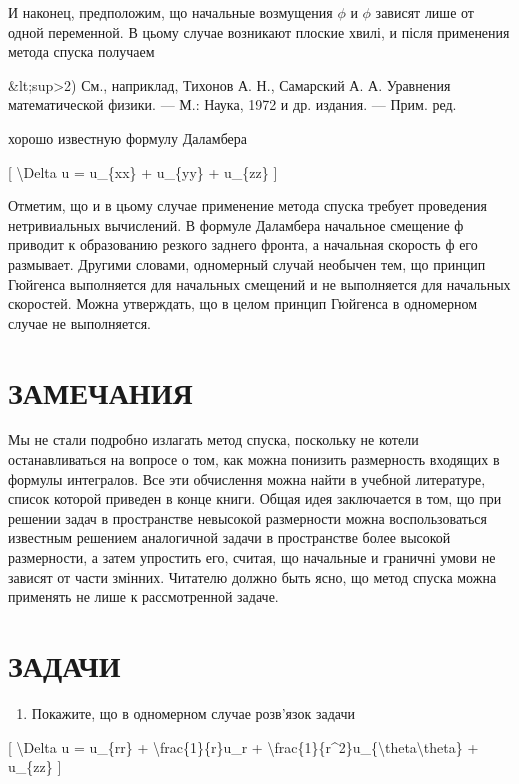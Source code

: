 \documentclass[
]{article}
\providecommand{\tightlist}{%
  \setlength{\itemsep}{0pt}\setlength{\parskip}{0pt}}
\begin{document}
И наконец, предположим, що начальные возмущения \(\phi\) и \(\phi\)
зависят лише от одной переменной. В цьому случае возникают плоские
хвилі, и після применения метода спуска получаем

\&lt;sup\textgreater2) См., наприклад, Тихонов А. Н., Самарский А. А.
Уравнения математической физики. --- М.: Наука, 1972 и др. издания. ---
Прим. ред.

хорошо известную формулу Даламбера

{[} \textbackslash Delta u = u\_\{xx\} + u\_\{yy\} + u\_\{zz\} {]}

Отметим, що и в цьому случае применение метода спуска требует проведения
нетривиальных вычислений. В формуле Даламбера начальное смещение ф
приводит к образованию резкого заднего фронта, а начальная скорость ф
его размывает. Другими словами, одномерный случай необычен тем, що
принцип Гюйгенса выполняется для начальных смещений и не выполняется для
начальных скоростей. Можна утверждать, що в целом принцип Гюйгенса в
одномерном случае не выполняется.

\section{ЗАМЕЧАНИЯ}\label{ux437ux430ux43cux435ux447ux430ux43dux438ux44f-8}

Мы не стали подробно излагать метод спуска, поскольку не котели
останавливаться на вопросе о том, как можна понизить размерность
входящих в формулы интегралов. Все эти обчислення можна найти в учебной
литературе, список которой приведен в конце книги. Общая идея
заключается в том, що при решении задач в пространстве невысокой
размерности можна воспользоваться известным решением аналогичной задачи
в пространстве более высокой размерности, а затем упростить его, считая,
що начальные и граничні умови не зависят от части змінних. Читателю
должно быть ясно, що метод спуска можна применять не лише к
рассмотренной задаче.

\section{ЗАДАЧИ}\label{ux437ux430ux434ux430ux447ux438-8}

\begin{enumerate}
\def\labelenumi{\arabic{enumi}.}
\tightlist
\item
  Покажите, що в одномерном случае розв'язок задачи
\end{enumerate}

{[} \textbackslash Delta u = u\_\{rr\} +
\textbackslash frac\{1\}\{r\}u\_r +
\textbackslash frac\{1\}\{r\^{}2\}u\_\{\textbackslash theta\textbackslash theta\}
+ u\_\{zz\} {]}
\end{document}
